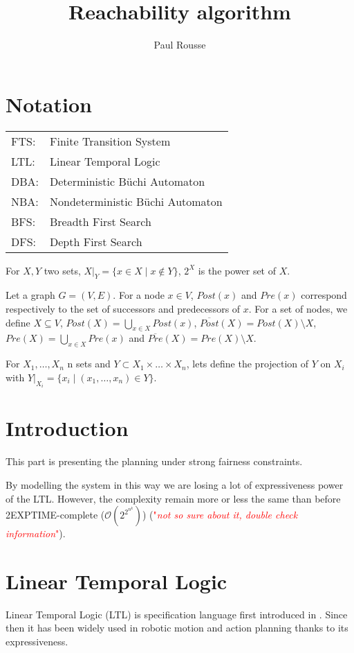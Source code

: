 \documentclass{article}
\newcommand\comment[1]{\textcolor{red}{"\textit{#1}"}}
\theoremstyle{named}
\newcommand{\outpost}{ \ensuremath{\overline{Post} } }
\newcommand{\inpre}{ \ensuremath{\overline{Pre} } }
\begin{document}
\title{Reachability algorithm}
\author{Paul Rousse}
\maketitle


\section*{Notation}
\begin{tabular}{ll}
FTS:& Finite Transition System\\
LTL:& Linear Temporal Logic\\
DBA:& Deterministic B\"uchi Automaton\\
NBA:& Nondeterministic B\"uchi Automaton\\
BFS:& Breadth First Search\\
DFS:& Depth First Search\\
\end{tabular}

For $X,Y$ two sets, $X|_Y = \{x \in X \mid x \notin  Y \}$, $2^X$ is the power set of $X$.

Let a graph $G = (V,E)$.
For a node $x \in V$, $Post(x)$ and $Pre(x)$ correspond respectively to the set of successors and predecessors of $x$. 
For a set of nodes, we define $X \subseteq V$, $Post(X) = \bigcup_{x \in X} Post(x)$, $\outpost(X) = Post(X) \setminus X$, $Pre(X) = \bigcup_{x \in X} Pre(x)$ and $\inpre(X) = Pre(X) \setminus X$.

For $X_1,\dots,X_n$ n sets and $Y \subset X_1 \times \dots \times X_n$, lets define the projection of $Y$ on $X_i$ with $Y|_{X_i} = \{x_i \mid (x_1,\dots,x_n) \in Y\}$.

\section{Introduction}

This part is presenting the planning under strong fairness constraints.

\cite{de2010generalized}
\cite{patrizi2013fair}


By modelling the system in this way we are losing a lot of expressiveness power of the LTL. However, the complexity remain more or less the same than before 2EXPTIME-complete ($\mathcal{O}(2^{2^{n^k}})$) (\comment{not so sure about it, double check information}).

\section{Linear Temporal Logic}
Linear Temporal Logic (LTL) is specification language first introduced in \cite{pnueli1977temporal}. Since then it has been widely used in robotic motion and action planning thanks to its expressiveness.
\end{document}
